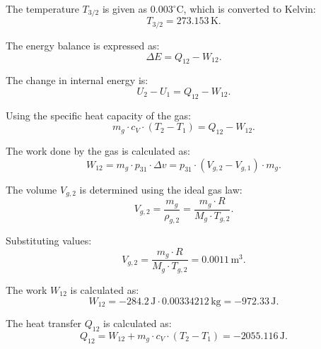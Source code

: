 The temperature \( T_{3/2} \) is given as \( 0.003^\circ\text{C} \), which is converted to Kelvin:  
\[
T_{3/2} = 273.153 \, \text{K}.
\]

The energy balance is expressed as:  
\[
\Delta E = Q_{12} - W_{12}.
\]

The change in internal energy is:  
\[
U_2 - U_1 = Q_{12} - W_{12}.
\]

Using the specific heat capacity of the gas:  
\[
m_g \cdot c_V \cdot (T_2 - T_1) = Q_{12} - W_{12}.
\]

The work done by the gas is calculated as:  
\[
W_{12} = m_g \cdot p_{31} \cdot \Delta v = p_{31} \cdot (V_{g,2} - V_{g,1}) \cdot m_g.
\]

The volume \( V_{g,2} \) is determined using the ideal gas law:  
\[
V_{g,2} = \frac{m_g}{\rho_{g,2}} = \frac{m_g \cdot R}{M_g \cdot T_{g,2}}.
\]

Substituting values:  
\[
V_{g,2} = \frac{m_g \cdot R}{M_g \cdot T_{g,2}} = 0.0011 \, \text{m}^3.
\]

The work \( W_{12} \) is calculated as:  
\[
W_{12} = -284.2 \, \text{J} \cdot 0.00334212 \, \text{kg} = -972.33 \, \text{J}.
\]

The heat transfer \( Q_{12} \) is calculated as:  
\[
Q_{12} = W_{12} + m_g \cdot c_V \cdot (T_2 - T_1) = -2055.116 \, \text{J}.
\]